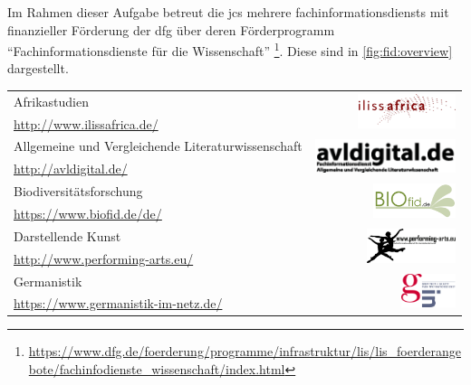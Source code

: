Im Rahmen dieser Aufgabe betreut die \gls{jcs}
mehrere \glspl{fachinformationsdienst}
mit finanzieller Förderung der \gls{dfg}
über deren Förderprogramm \enquote{Fachinformationsdienste für die Wissenschaft}
\footnote{\url{https://www.dfg.de/foerderung/programme/infrastruktur/lis/lis_foerderangebote/fachinfodienste_wissenschaft/index.html}}.
Diese sind in \cref{fig:fid:overview} dargestellt.

\begin{table}
	\begin{tabularx}{\textwidth}{l r}
		Afrikastudien                                      & \multirow{2}{*}{\href{http://www.ilissafrica.de/}{\includegraphics[height=1cm]{figures/ilissLogo.png}}}            \\ \footnotesize{\url{http://www.ilissafrica.de/}} &\\[2ex]
		Allgemeine und Vergleichende Literaturwissenschaft & \multirow{2}{*}{\href{http://avldigital.de/}{\includegraphics[height=1cm]{figures/avl.png}}}                       \\ \footnotesize{\url{http://avldigital.de/}}&\\[2ex]
		Biodiversitätsforschung                            & \multirow{2}{*}{\href{https://www.biofid.de/de/}{\includegraphics[height=1cm]{figures/biofid_160.png}}}            \\ \footnotesize{\url{https://www.biofid.de/de/}} & \\[2ex]
		Darstellende Kunst                                 & \multirow{2}{*}{\href{http://www.performing-arts.eu/}{\includegraphics[height=1cm]{figures/fid-dk_160.png}}}       \\ \footnotesize{\url{http://www.performing-arts.eu/}} & \\[2ex]
		Germanistik                                        & \multirow{2}{*}{\href{https://www.germanistik-im-netz.de/}{\includegraphics[height=1cm]{figures/gin_logo150.png}}} \\ \footnotesize{\url{https://www.germanistik-im-netz.de/}} & \\[2ex]

\end{tabularx}
\end{table}
